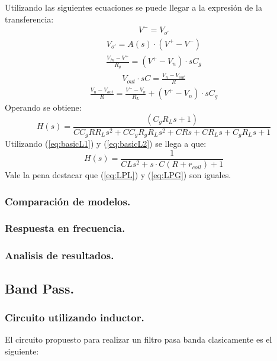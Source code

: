 \documentclass[a4paper]{article}
\begin{document}
Utilizando las siguientes ecuaciones se puede llegar a la expresión de la transferencia:
\begin{align}V^- = V_{o'}\end{align}
\begin{align}V_{o'} = A(s)\cdot (V^+-V^-)\end{align}
\begin{align}\frac{V_{In}-V^+}{R_g}=(V^+-V_n)\cdot s C_g\end{align}
\begin{align}V_{out}\cdot s C=\frac{V_{n}-V_{out}}{R}\end{align}
\begin{align}\frac{V_{n}-V_{out}}{R}=\frac{V^--V_n}{R_L} +(V^+-V_n)\cdot s C_g\end{align}
Operando se obtiene:
\begin{equation} H(s)= \frac{\left(C_g R_L s + 1\right)}{C C_g R R_L s^{2} + C C_g R_g R_L s^{2} + C R s + C R_L s + C_g R_L s + 1}
\end{equation}
Utilizando (\ref{eq:basicL1}) y (\ref{eq:basicL2}) se llega a que:
\begin{equation} H(s)= \frac{1}{C L s^{2} + s\cdot C (R+r_{coil}) + 1}
\label{eq:LPG}
\end{equation}
Vale la pena destacar que (\ref{eq:LPL}) y (\ref{eq:LPG}) son iguales.
\subsubsection{Comparación de modelos.}
\subsubsection{Respuesta en frecuencia.}
\subsubsection{Analisis de resultados.}
\newpage
\subsection{Band Pass.}
\subsubsection{Circuito utilizando inductor.}
El circuito propuesto para realizar un filtro pasa banda clasicamente es el siguiente:
\end{document}
